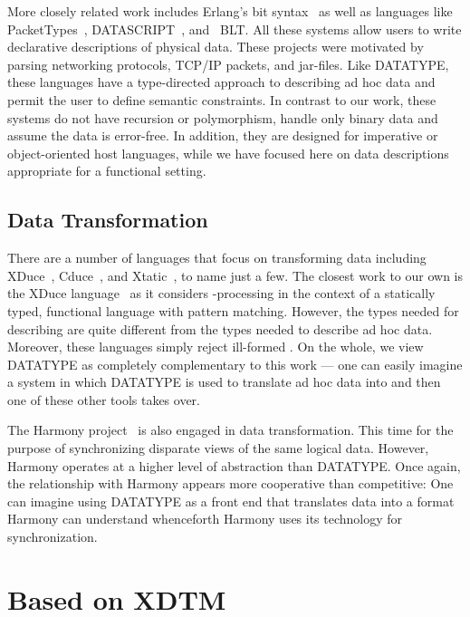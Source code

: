 More closely related work includes Erlang{}'s bit
syntax~\cite{erlang} as well as languages like PacketTypes~\cite{sigcomm00},
DATASCRIPT~\cite{gpce02}, and ~BLT\cite{eger:blt}. 
All these systems allow users to write declarative
descriptions of physical data.  These projects were motivated by
parsing networking protocols, \textsc{TCP/IP} packets, and \java{} 
jar-files.  Like DATATYPE, these languages have a type-directed
approach to describing ad hoc data and permit the user to define
semantic constraints.  In contrast to our work, these systems 
do not have recursion or polymorphism, handle
only binary data and assume the data is error-free.
In addition, they are designed for imperative or object-oriented host
languages, while we have focused here on data descriptions appropriate for a
functional setting.

\subsection{Data Transformation}
There are a number of languages that focus on transforming \xml{}
data including XDuce~\cite{hosoya+:xduce-journal}, 
Cduce~\cite{benzaken+:cduce}, and 
Xtatic~\cite{gapeyev+:XtaticRuntime}, to name just a few.
The closest work to our own is the XDuce
language~\cite{hosoya+:xduce-journal} as it considers
\xml-processing in the context of a
statically typed, functional language with pattern matching. 
However, the types needed for describing \xml{} are quite different
from the types needed to describe ad hoc data.  Moreover,
these languages simply reject ill-formed \xml.  On the whole,
we view DATATYPE{} as completely complementary to this work ---
one can easily imagine a system in which DATATYPE{} is used to translate
ad hoc data into \xml{} and then one of these other tools takes over.
 
The Harmony project~\cite{foster+:lenses} is also engaged in 
data transformation.  This time for the purpose of synchronizing
disparate views of the same logical data. 
However, Harmony operates at a higher 
level of abstraction than DATATYPE.  Once again, the relationship 
with Harmony appears more cooperative than competitive:  One can 
imagine using DATATYPE{} as a front end that translates data into 
a format Harmony can understand whenceforth Harmony uses
its technology for synchronization.  

\section{Based on XDTM}

